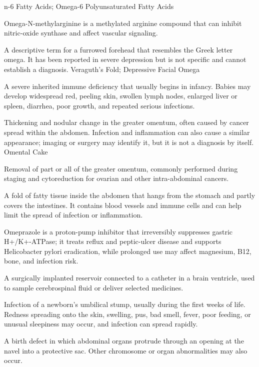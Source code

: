 \synonyms
n-6 Fatty Acids; Omega-6 Polyunsaturated Fatty Acids

 Omega-N-methylarginine is a methylated arginine compound that can inhibit nitric-oxide synthase and affect vascular signaling.

 A descriptive term for a furrowed forehead that resembles the Greek letter omega. It has been reported in severe depression but is not specific and cannot establish a diagnosis.
\synonyms
Veraguth's Fold; Depressive Facial Omega

 A severe inherited immune deficiency that usually begins in infancy. Babies may develop widespread red, peeling skin, swollen lymph nodes, enlarged liver or spleen, diarrhea, poor growth, and repeated serious infections.

 Thickening and nodular change in the greater omentum, often caused by cancer spread within the abdomen. Infection and inflammation can also cause a similar appearance; imaging or surgery may identify it, but it is not a diagnosis by itself.
\synonyms
Omental Cake

 Removal of part or all of the greater omentum, commonly performed during staging and
cytoreduction for ovarian and other intra-abdominal cancers.

 A fold of fatty tissue inside the abdomen that hangs from the stomach and partly covers the intestines. It contains blood vessels and immune cells and can help limit the spread of infection or inflammation.

 Omeprazole is a proton-pump inhibitor that irreversibly suppresses gastric H+/K+-ATPase; it treats reflux and peptic-ulcer disease and supports Helicobacter pylori eradication, while prolonged use may affect magnesium, B12, bone, and infection risk.

 A surgically implanted reservoir connected to a catheter in a brain ventricle, used to sample cerebrospinal fluid or deliver selected medicines.

 Infection of a newborn’s umbilical stump, usually during the first weeks of life. Redness spreading onto the skin, swelling, pus, bad smell, fever, poor feeding, or unusual sleepiness may occur, and infection can spread rapidly.

 A birth defect in which abdominal organs protrude through an opening at the navel into a protective sac. Other chromosome or organ abnormalities may also occur.

